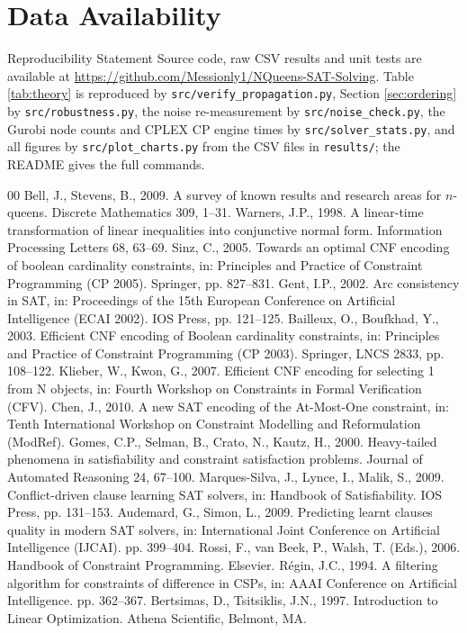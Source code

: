 \documentclass[a4paper,fleqn]{cas-sc}
\begin{document}
\section*{Data Availability}
\begin{notebox}{Reproducibility Statement}
Source code, raw CSV results and unit tests are available at \url{https://github.com/Messionly1/NQueens-SAT-Solving}. Table \ref{tab:theory} is reproduced by \texttt{src/verify\_propagation.py}, Section \ref{sec:ordering} by \texttt{src/robustness.py}, the noise re-measurement by \texttt{src/noise\_check.py}, the Gurobi node counts and CPLEX CP engine times by \texttt{src/solver\_stats.py}, and all figures by \texttt{src/plot\_charts.py} from the CSV files in \texttt{results/}; the README gives the full commands.
\end{notebox}

\begin{thebibliography}{00}
\footnotesize
\setlength{\itemsep}{0pt}
\setlength{\parskip}{0pt}
 Bell, J., Stevens, B., 2009. A survey of known results and research areas for $n$-queens. Discrete Mathematics 309, 1–31.
 Warners, J.P., 1998. A linear-time transformation of linear inequalities into conjunctive normal form. Information Processing Letters 68, 63–69.
 Sinz, C., 2005. Towards an optimal CNF encoding of boolean cardinality constraints, in: Principles and Practice of Constraint Programming (CP 2005). Springer, pp. 827–831.
 Gent, I.P., 2002. Arc consistency in SAT, in: Proceedings of the 15th European Conference on Artificial Intelligence (ECAI 2002). IOS Press, pp. 121–125.
 Bailleux, O., Boufkhad, Y., 2003. Efficient CNF encoding of Boolean cardinality constraints, in: Principles and Practice of Constraint Programming (CP 2003). Springer, LNCS 2833, pp. 108–122.
 Klieber, W., Kwon, G., 2007. Efficient CNF encoding for selecting 1 from N objects, in: Fourth Workshop on Constraints in Formal Verification (CFV).
 Chen, J., 2010. A new SAT encoding of the At-Most-One constraint, in: Tenth International Workshop on Constraint Modelling and Reformulation (ModRef).
 Gomes, C.P., Selman, B., Crato, N., Kautz, H., 2000. Heavy-tailed phenomena in satisfiability and constraint satisfaction problems. Journal of Automated Reasoning 24, 67–100.
 Marques-Silva, J., Lynce, I., Malik, S., 2009. Conflict-driven clause learning SAT solvers, in: Handbook of Satisfiability. IOS Press, pp. 131–153.
 Audemard, G., Simon, L., 2009. Predicting learnt clauses quality in modern SAT solvers, in: International Joint Conference on Artificial Intelligence (IJCAI). pp. 399–404.
 Rossi, F., van Beek, P., Walsh, T. (Eds.), 2006. Handbook of Constraint Programming. Elsevier.
 Régin, J.C., 1994. A filtering algorithm for constraints of difference in CSPs, in: AAAI Conference on Artificial Intelligence. pp. 362–367.
 Bertsimas, D., Tsitsiklis, J.N., 1997. Introduction to Linear Optimization. Athena Scientific, Belmont, MA.
\end{thebibliography}
\end{document}
